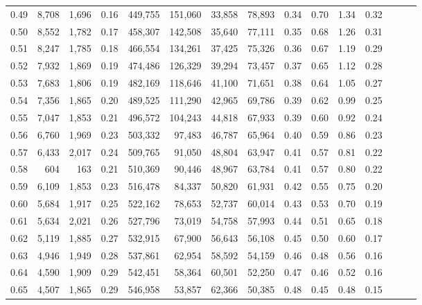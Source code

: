 \begin{tabular}{rrrrrrrrrrrrrrr}
0.49 &   8,708 &  1,696 &  0.16 &  449,755 &  151,060 &   33,858 &   78,893 &  0.34 &  0.70 &  1.34 &      0.32 \\
0.50 &   8,552 &  1,782 &  0.17 &  458,307 &  142,508 &   35,640 &   77,111 &  0.35 &  0.68 &  1.26 &      0.31 \\
0.51 &   8,247 &  1,785 &  0.18 &  466,554 &  134,261 &   37,425 &   75,326 &  0.36 &  0.67 &  1.19 &      0.29 \\
0.52 &   7,932 &  1,869 &  0.19 &  474,486 &  126,329 &   39,294 &   73,457 &  0.37 &  0.65 &  1.12 &      0.28 \\
0.53 &   7,683 &  1,806 &  0.19 &  482,169 &  118,646 &   41,100 &   71,651 &  0.38 &  0.64 &  1.05 &      0.27 \\
0.54 &   7,356 &  1,865 &  0.20 &  489,525 &  111,290 &   42,965 &   69,786 &  0.39 &  0.62 &  0.99 &      0.25 \\
0.55 &   7,047 &  1,853 &  0.21 &  496,572 &  104,243 &   44,818 &   67,933 &  0.39 &  0.60 &  0.92 &      0.24 \\
0.56 &   6,760 &  1,969 &  0.23 &  503,332 &   97,483 &   46,787 &   65,964 &  0.40 &  0.59 &  0.86 &      0.23 \\
0.57 &   6,433 &  2,017 &  0.24 &  509,765 &   91,050 &   48,804 &   63,947 &  0.41 &  0.57 &  0.81 &      0.22 \\
0.58 &     604 &    163 &  0.21 &  510,369 &   90,446 &   48,967 &   63,784 &  0.41 &  0.57 &  0.80 &      0.22 \\
0.59 &   6,109 &  1,853 &  0.23 &  516,478 &   84,337 &   50,820 &   61,931 &  0.42 &  0.55 &  0.75 &      0.20 \\
0.60 &   5,684 &  1,917 &  0.25 &  522,162 &   78,653 &   52,737 &   60,014 &  0.43 &  0.53 &  0.70 &      0.19 \\
0.61 &   5,634 &  2,021 &  0.26 &  527,796 &   73,019 &   54,758 &   57,993 &  0.44 &  0.51 &  0.65 &      0.18 \\
0.62 &   5,119 &  1,885 &  0.27 &  532,915 &   67,900 &   56,643 &   56,108 &  0.45 &  0.50 &  0.60 &      0.17 \\
0.63 &   4,946 &  1,949 &  0.28 &  537,861 &   62,954 &   58,592 &   54,159 &  0.46 &  0.48 &  0.56 &      0.16 \\
0.64 &   4,590 &  1,909 &  0.29 &  542,451 &   58,364 &   60,501 &   52,250 &  0.47 &  0.46 &  0.52 &      0.16 \\
0.65 &   4,507 &  1,865 &  0.29 &  546,958 &   53,857 &   62,366 &   50,385 &  0.48 &  0.45 &  0.48 &      0.15 \\

\end{tabular}
